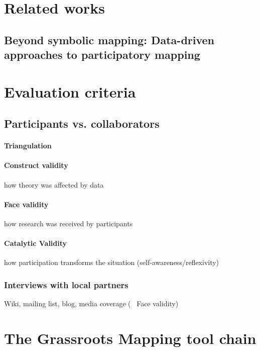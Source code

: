 \documentclass[11pt]{report}
\begin{document}
\chapter{Related works}
\section{Beyond symbolic mapping: Data-driven approaches to participatory mapping}

\chapter{Evaluation criteria}
\section{Participants vs. collaborators}
\subsubsection{Triangulation}
\subsubsection{Construct validity}
how theory was affected by data
\subsubsection{Face validity}
how research was received by participants
\subsubsection{Catalytic Validity}
how participation transforms the situation (self-awareness/reflexivity)

\subsection{Interviews with local partners}
Wiki, mailing list, blog, media coverage (~ Face validity)

\chapter{The Grassroots Mapping tool chain}
\end{document}
